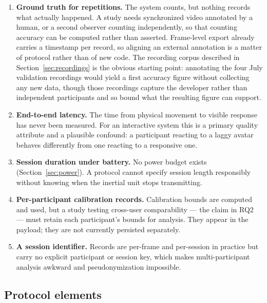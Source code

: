 \documentclass[11pt,a4paper]{article}
\begin{document}
\begin{enumerate}
\item \textbf{Ground truth for repetitions.} The system counts, but nothing
records what actually happened. A study needs synchronized video annotated by a
human, or a second observer counting independently, so that counting accuracy
can be computed rather than asserted. Frame-level export already carries a
timestamp per record, so aligning an external annotation is a matter of
protocol rather than of new code. The recording corpus described in
Section~\ref{sec:recordings} is the obvious starting point: annotating the four
July validation recordings would yield a first accuracy figure without
collecting any new data, though those recordings capture the developer rather
than independent participants and so bound what the resulting figure can
support.

\item \textbf{End-to-end latency.} The time from physical movement to visible
response has never been measured. For an interactive system this is a primary
quality attribute and a plausible confound: a participant reacting to a laggy
avatar behaves differently from one reacting to a responsive one.

\item \textbf{Session duration under battery.} No power budget exists
(Section~\ref{sec:power}). A protocol cannot specify session length responsibly
without knowing when the inertial unit stops transmitting.

\item \textbf{Per-participant calibration records.} Calibration bounds are
computed and used, but a study testing cross-user comparability --- the claim in
RQ2 --- must retain each participant's bounds for analysis. They appear in the
payload; they are not currently persisted separately.

\item \textbf{A session identifier.} Records are per-frame and per-session in
practice but carry no explicit participant or session key, which makes
multi-participant analysis awkward and pseudonymization impossible.
\end{enumerate}

\subsection{Protocol elements}
\end{document}
